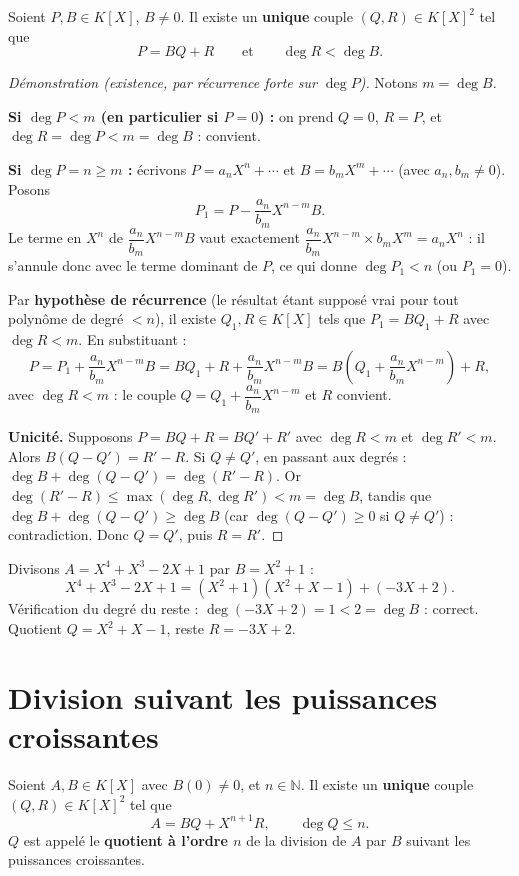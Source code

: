 \documentclass[a4paper,12pt,openany]{book}
\begin{document}
\begin{theoreme}
Soient $P,B\in K[X]$, $B\neq0$. Il existe un \textbf{unique} couple
$(Q,R)\in K[X]^2$ tel que
\[
P = BQ+R \qquad \text{et} \qquad \deg R < \deg B.
\]
\end{theoreme}

\begin{proof}[Démonstration (existence, par récurrence forte sur $\deg P$)]
Notons $m=\deg B$.

\textbf{Si $\deg P < m$ (en particulier si $P=0$) :} on prend $Q=0$,
$R=P$, et $\deg R=\deg P<m=\deg B$ : convient.

\textbf{Si $\deg P = n \geq m$ :} écrivons $P=a_nX^n+\cdots$ et
$B=b_mX^m+\cdots$ (avec $a_n,b_m\neq0$). Posons
\[
P_1 = P - \frac{a_n}{b_m}X^{n-m}B.
\]
Le terme en $X^n$ de $\dfrac{a_n}{b_m}X^{n-m}B$ vaut exactement
$\dfrac{a_n}{b_m}X^{n-m}\times b_mX^m = a_nX^n$ : il s'annule donc avec le
terme dominant de $P$, ce qui donne $\deg P_1 < n$ (ou $P_1=0$).

Par \textbf{hypothèse de récurrence} (le résultat étant supposé vrai pour
tout polynôme de degré $<n$), il existe $Q_1,R\in K[X]$ tels que
$P_1 = BQ_1+R$ avec $\deg R<m$. En substituant :
\[
P = P_1 + \frac{a_n}{b_m}X^{n-m}B = BQ_1+R+\frac{a_n}{b_m}X^{n-m}B =
B\left(Q_1+\frac{a_n}{b_m}X^{n-m}\right) + R,
\]
avec $\deg R<m$ : le couple $Q=Q_1+\dfrac{a_n}{b_m}X^{n-m}$ et $R$
convient.

\textbf{Unicité.} Supposons $P=BQ+R=BQ'+R'$ avec $\deg R<m$ et
$\deg R'<m$. Alors $B(Q-Q')=R'-R$. Si $Q\neq Q'$, en passant aux
degrés : $\deg B + \deg(Q-Q') = \deg(R'-R)$. Or
$\deg(R'-R) \leq \max(\deg R,\deg R') < m = \deg B$, tandis que
$\deg B + \deg(Q-Q') \geq \deg B$ (car $\deg(Q-Q')\geq0$ si
$Q\neq Q'$) : contradiction. Donc $Q=Q'$, puis $R=R'$.
\end{proof}

\begin{exemple}[7.2]
Divisons $A=X^4+X^3-2X+1$ par $B=X^2+1$ :
\[
X^4+X^3-2X+1 = (X^2+1)(X^2+X-1) + (-3X+2).
\]
Vérification du degré du reste : $\deg(-3X+2)=1 < 2 = \deg B$ : correct.
Quotient $Q=X^2+X-1$, reste $R=-3X+2$.
\end{exemple}

\section{Division suivant les puissances croissantes}


\begin{theoreme}
Soient $A,B\in K[X]$ avec $B(0)\neq0$, et $n\in\mathbb{N}$. Il existe un
\textbf{unique} couple $(Q,R)\in K[X]^2$ tel que
\[
A = BQ + X^{n+1}R, \qquad \deg Q \leq n.
\]
$Q$ est appelé le \textbf{quotient à l'ordre $n$} de la division de $A$
par $B$ suivant les puissances croissantes.
\end{theoreme}
\end{document}
